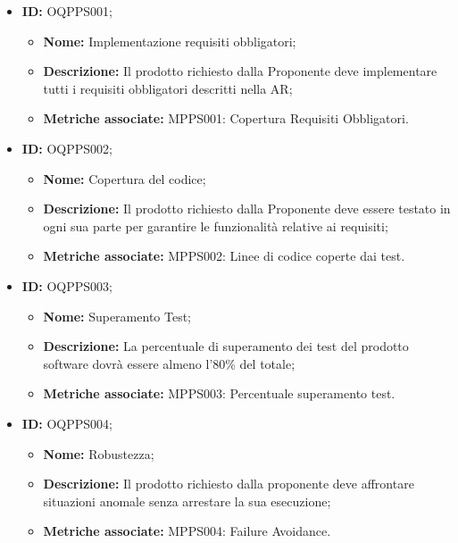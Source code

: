 \documentclass[openany,12pt,a4paper]{report}
\begin{document}
        
        \begin{itemize}
            \item \textbf{ID:} OQPPS001;
            \begin{itemize} 
            	\item \textbf{Nome:} Implementazione requisiti obbligatori;
            	\item \textbf{Descrizione:} Il prodotto richiesto dalla Proponente deve implementare tutti i requisiti obbligatori descritti nella AR;
            	\item \textbf{Metriche associate:} MPPS001: Copertura Requisiti Obbligatori.
            \end{itemize}
        \end{itemize}
        
        \begin{itemize}
            \item \textbf{ID:} OQPPS002;
            \begin{itemize} 
            	\item \textbf{Nome:} Copertura del codice;
            	\item \textbf{Descrizione:} Il prodotto richiesto dalla Proponente deve essere testato in ogni sua parte per garantire le funzionalità relative ai requisiti;
            	\item \textbf{Metriche associate:} MPPS002: Linee di codice coperte dai test.
            \end{itemize}
        \end{itemize} 
        
        \begin{itemize}
            \item \textbf{ID:} OQPPS003;
            \begin{itemize} 
            	\item \textbf{Nome:} Superamento Test;
            	\item \textbf{Descrizione:} La percentuale di superamento dei test del prodotto software dovrà essere almeno l'80\% del totale;
            	\item \textbf{Metriche associate:} MPPS003: Percentuale superamento test.
            \end{itemize}
        \end{itemize} 
        
        \begin{itemize}
            \item \textbf{ID:} OQPPS004;
            \begin{itemize} 
            	\item \textbf{Nome:} Robustezza;
            	\item \textbf{Descrizione:} Il prodotto richiesto dalla proponente deve affrontare situazioni anomale senza arrestare la sua esecuzione;
            	\item \textbf{Metriche associate:} MPPS004: Failure Avoidance.
            \end{itemize}
        \end{itemize}
        
\end{document}
